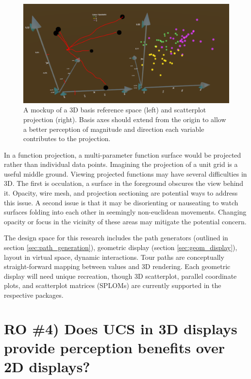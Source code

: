 \documentclass{monashthesis}
\begin{document}
\begin{figure}

{\centering \includegraphics[width=0.7\linewidth]{./figures/RO3MockUp2} 

}

\caption{A mockup of a 3D basis reference space (left) and scatterplot projection (right). Basis axes should extend from the origin to allow a better perception of magnitude and direction each variable contributes to the projection.}\label{fig:RO3MockUp}
\end{figure}

In a function projection, a multi-parameter function surface would be projected rather than individual data points. Imagining the projection of a unit grid is a useful middle ground. Viewing projected functions may have several difficulties in 3D. The first is occulation, a surface in the foreground obscures the view behind it. Opacity, wire mesh, and projection sectioning \autocite{furnas_prosection_1994} are potential ways to address this issue. A second issue is that it may be disorienting or nauseating to watch surfaces folding into each other in seemingly non-euclidean movements. Changing opacity or focus in the vicinity of these areas may mitigate the potential concern.

The design space for this research includes the path generators (outlined in section \ref{sec:path_generation}), geometric display (section \ref{sec:geom_display}), layout in virtual space, dynamic interactions. Tour paths are conceptually straight-forward mapping between values and 3D rendering. Each geometric display will need unique recreation, though 3D scatterplot, parallel coordinate plots, and scatterplot matrices (SPLOMs) are currently supported in the respective packages.

\hypertarget{UCS_3dvs2d}{%
\section{RO \#4) Does UCS in 3D displays provide perception benefits over 2D displays?}\label{UCS_3dvs2d}}
\end{document}

